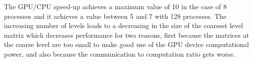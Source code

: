 The GPU/CPU speed-up achieves a maximum value of 10 in the case of 8
processes and it achieves a value between  5 and 7  with 128
processes. The  increasing number of levels leads to a decreasing in
the size of the coarsest level matrix which decreases performance for
two reasons, first because the matrices at the coarse level are too
small to make good use of the GPU device computational power, and also
because the communication to computation ratio gets worse.




